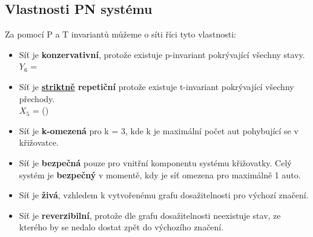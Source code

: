 \newpage
\subsection*{Vlastnosti PN systému}
\label{subsec:pn_properties}

Za pomocí P a T invariantů můžeme o síti říci tyto vlastnosti:

\begin{itemize}
    \item Síť je \textbf{konzervativní}, protože existuje p-invariant pokrývající všechny stavy. \\ $Y_6$ = \orderArrayNumbered{\pAll}
    \item Síť je \textbf{\underline{striktně} repetiční} protože existuje t-invariant pokrývající všechny přechody. \\ $X_5$ = (\tAll)
    \item Síť je \textbf{k-omezená} pro k = 3, kde k je maximální počet aut pohybující se v křižovatce.
    \item {
        Síť je \textbf{bezpečná} pouze pro vnitřní komponentu systému křižovatky.
        Celý systém je \textbf{bezpečný} v momentě, kdy je síť omezena pro maximálně 1 auto.
    }
    \item Síť je \textbf{živá}, vzhledem k vytvořenému grafu dosažitelnosti pro výchozí značení.
    \item Síť je \textbf{reverzibilní}, protože dle grafu dosažitelnosti neexistuje stav, ze kterého by se nedalo dostat zpět do výchozího značení.
\end{itemize}

\endinput